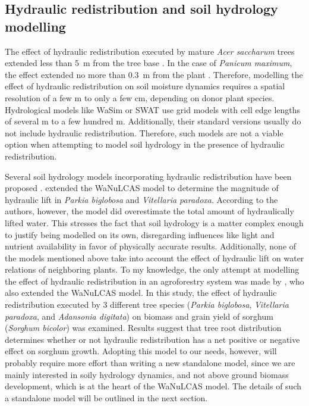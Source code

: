 \subsection{Hydraulic redistribution and soil hydrology modelling}

The effect of hydraulic redistribution executed by mature \emph{Acer saccharum} trees extended less than \SI{5}{\metre} from the tree base \parencite{dawson_hydraulic_1993}.  In the case of \emph{Panicum maximum}, the effect extended no more than \SI{0.3}{\metre} from the plant \parencite{sekiya_applying_2011}.  Therefore, modelling the effect of hydraulic redistribution on soil moisture dynamics requires a spatial resolution of a few \si{\metre} to only a few \si{\centi\metre}, depending on donor plant species.  Hydrological models like WaSim \parencite{schulla_hydrologische_1997} or SWAT \parencite{arnold_large_1998} use grid models with cell edge lengths of several \si{\metre} to a few hundred \si{\metre}.  Additionally, their standard versions usually do not include hydraulic redistribution.  Therefore, such models are not a viable option when attempting to model soil hydrology in the presence of hydraulic redistribution.

Several soil hydrology models incorporating hydraulic redistribution have been proposed \parencite[e.g.,][]{gou_groundwater-soil-plant-atmosphere_2014,ryel_hydraulic_2002}.  \textcite{bayala_hydraulic_2008} extended the WaNuLCAS model \parencite{noordwijk_wanulcas_2011} to determine the magnitude of hydraulic lift in \emph{Parkia biglobosa} and \emph{Vitellaria paradoxa}.  According to the authors, however, the model did overestimate the total amount of hydraulically lifted water.  This stresses the fact that soil hydrology is a matter complex enough to justify being modelled on its own, disregarding influences like light and nutrient availability in favor of physically accurate results.  Additionally, none of the models mentioned above take into account the effect of hydraulic lift on water relations of neighboring plants.  To my knowledge, the only attempt at modelling the effect of hydraulic redistribution in an agroforestry system was made by \textcite{coulibaly_crop_2014}, who also extended the WaNuLCAS model.  In this study, the effect of hydraulic redistribution executed by 3 different tree species (\emph{Parkia biglobosa}, \emph{Vitellaria paradoxa}, and \emph{Adansonia digitata}) on biomass and grain yield of sorghum (\emph{Sorghum bicolor}) was examined.  Results suggest that tree root distribution determines whether or not hydraulic redistribution has a net positive or negative effect on sorghum growth.  Adopting this model to our needs, however, will probably require more effort than writing a new standalone model, since we are mainly interested in soily hydrology dynamics, and not above ground biomass development, which is at the heart of the WaNuLCAS model.  The details of such a standalone model will be outlined in the next section.

